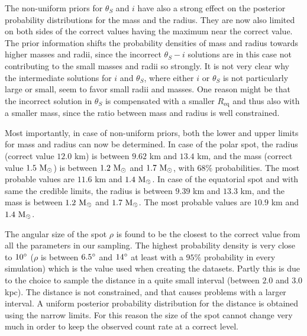 \documentclass{wihuri}
\def\msun{{\rm M_{\odot}}}
\def\thetas{\theta_{S}}
\def\req{R_{\mathrm{eq}}}
\begin{document}
The non-uniform priors for $\thetas$ and $i$ have also a strong effect on the posterior probability distributions for the mass and the radius. They are now also limited on both sides of the correct values having the maximum near the correct value. The prior information shifts the probability densities of mass and radius towards higher masses and radii, since the incorrect $\thetas - i$ solutions are in this case not contributing to the small masses and radii so strongly. %
It is not very clear why the intermediate solutions for $i$ and $\thetas$, where either $i$ or $\thetas$ is not particularly large or small, seem to favor small radii and masses. One reason might be that the incorrect solution in $\thetas$ is compensated with a smaller $\req$ and thus also with a smaller mass, since the ratio between mass and radius is well constrained.   

Most importantly, in case of non-uniform priors, both the lower and upper limits for mass and radius can now be determined. In case of the polar spot, the radius (correct value $12.0$ km) is between $9.62$ km and $13.4$ km, and the mass (correct value $1.5 ~\msun$) is between $1.2 ~\msun$ and $1.7 ~\msun$, with $68 \%$ probabilities. The most probable values are $11.6$ km and $1.4 ~\msun$. In case of the equatorial spot and with same the credible limits, the radius is between $9.39$ km and $13.3$ km, and the mass is between $1.2 ~\msun$ and $1.7 ~\msun$. The most probable values are $10.9$ km and $1.4 ~\msun$. 

The angular size of the spot $\rho$ is found to be the closest to the correct value from all the  parameters in our sampling. The highest probability density is very close to $10 \degree$ ($\rho$ is between $6.5 \degree$ and $14 \degree$ at least with a $95 \%$ probability in every simulation) which is the value used when creating the datasets. Partly this is due to the choice to sample the distance in a quite small interval (between $2.0$ and $3.0$ kpc). The distance is not constrained, and that causes problems with a larger interval. A uniform posterior probability distribution for the distance is obtained using the narrow limits. For this reason the size of the spot cannot change very much in order to keep the observed count rate at a correct level.
\end{document}
